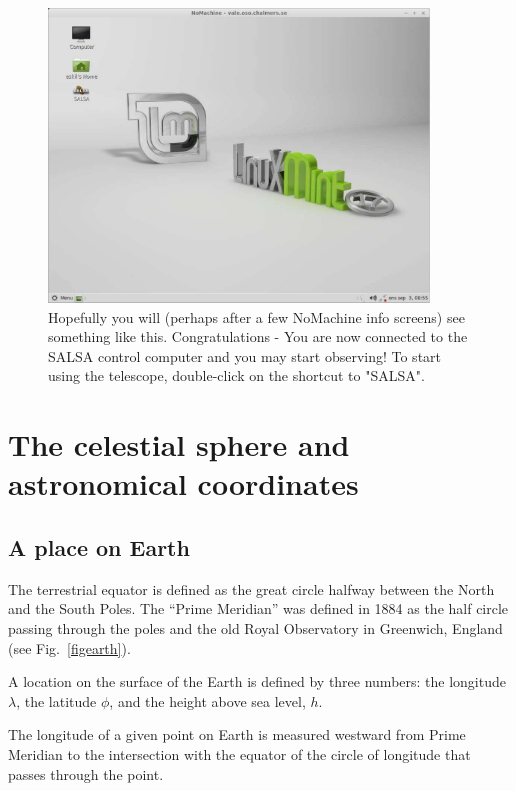 \begin{figure}[H]
    \centering
	\includegraphics[width=0.9\textwidth]{../figures/nomachinefigs/fig9-connected.pdf}
    \caption{Hopefully you will (perhaps after a few NoMachine info screens)
see something like this. Congratulations - You are now connected to the SALSA
control computer and you may start observing! 
To start using the telescope, double-click on the shortcut to "SALSA".} \label{fig:connected}
\end{figure}

\chapter{The celestial sphere and astronomical coordinates}
\label{appcoord}

\section{A place on Earth}

The terrestrial equator is defined as the great circle halfway between
the North and the South Poles.  The ``Prime Meridian'' was defined in
1884 as the half circle passing through the poles and the old Royal
Observatory in Greenwich, England (see Fig.~\ref{figearth}).

A location on the surface of the Earth is defined by three numbers:
the longitude $\lambda$, the latitude $\phi$, and the height above sea
level, $h$.

The longitude of a given point on Earth is measured westward from
Prime Meridian to the intersection with the equator of the circle of
longitude that passes through the point.

